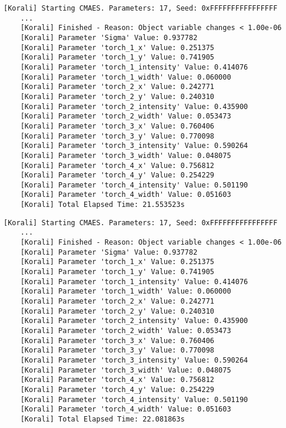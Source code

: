 \documentclass[11pt]{article}
\begin{document}
    \begin{lstlisting}[basicstyle=\tiny, frame=single, caption={Korali
    output for the UPC++ conduit when running the code from Task 1 with
    population size 23.}, label={lst:Task4UPCXX}]
    [Korali] Starting CMAES. Parameters: 17, Seed: 0xFFFFFFFFFFFFFFFF
    ...
    [Korali] Finished - Reason: Object variable changes < 1.00e-06
    [Korali] Parameter 'Sigma' Value: 0.937782
    [Korali] Parameter 'torch_1_x' Value: 0.251375
    [Korali] Parameter 'torch_1_y' Value: 0.741905
    [Korali] Parameter 'torch_1_intensity' Value: 0.414076
    [Korali] Parameter 'torch_1_width' Value: 0.060000
    [Korali] Parameter 'torch_2_x' Value: 0.242771
    [Korali] Parameter 'torch_2_y' Value: 0.240310
    [Korali] Parameter 'torch_2_intensity' Value: 0.435900
    [Korali] Parameter 'torch_2_width' Value: 0.053473
    [Korali] Parameter 'torch_3_x' Value: 0.760406
    [Korali] Parameter 'torch_3_y' Value: 0.770098
    [Korali] Parameter 'torch_3_intensity' Value: 0.590264
    [Korali] Parameter 'torch_3_width' Value: 0.048075
    [Korali] Parameter 'torch_4_x' Value: 0.756812
    [Korali] Parameter 'torch_4_y' Value: 0.254229
    [Korali] Parameter 'torch_4_intensity' Value: 0.501190
    [Korali] Parameter 'torch_4_width' Value: 0.051603
    [Korali] Total Elapsed Time: 21.553523s
    \end{lstlisting}

    \begin{lstlisting}[basicstyle=\tiny, frame=single, caption={Korali
    output for the MPI conduit when running the code from Task 1 with
    population size 23.}, label={lst:Task4MPI}]
    [Korali] Starting CMAES. Parameters: 17, Seed: 0xFFFFFFFFFFFFFFFF
    ...
    [Korali] Finished - Reason: Object variable changes < 1.00e-06
    [Korali] Parameter 'Sigma' Value: 0.937782
    [Korali] Parameter 'torch_1_x' Value: 0.251375
    [Korali] Parameter 'torch_1_y' Value: 0.741905
    [Korali] Parameter 'torch_1_intensity' Value: 0.414076
    [Korali] Parameter 'torch_1_width' Value: 0.060000
    [Korali] Parameter 'torch_2_x' Value: 0.242771
    [Korali] Parameter 'torch_2_y' Value: 0.240310
    [Korali] Parameter 'torch_2_intensity' Value: 0.435900
    [Korali] Parameter 'torch_2_width' Value: 0.053473
    [Korali] Parameter 'torch_3_x' Value: 0.760406
    [Korali] Parameter 'torch_3_y' Value: 0.770098
    [Korali] Parameter 'torch_3_intensity' Value: 0.590264
    [Korali] Parameter 'torch_3_width' Value: 0.048075
    [Korali] Parameter 'torch_4_x' Value: 0.756812
    [Korali] Parameter 'torch_4_y' Value: 0.254229
    [Korali] Parameter 'torch_4_intensity' Value: 0.501190
    [Korali] Parameter 'torch_4_width' Value: 0.051603
    [Korali] Total Elapsed Time: 22.081863s
    \end{lstlisting}
\end{document}
